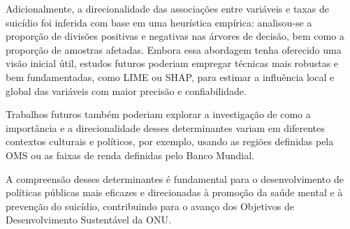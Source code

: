 \documentclass[letterpaper]{article}
\begin{document}
Adicionalmente, a direcionalidade das associações entre variáveis e taxas de suicídio foi inferida com base em uma heurística empírica: analisou-se a proporção de divisões positivas e negativas nas árvores de decisão, bem como a proporção de amostras afetadas. Embora essa abordagem tenha oferecido uma visão inicial útil, estudos futuros poderiam empregar técnicas mais robustas e bem fundamentadas, como LIME ou SHAP, para estimar a influência local e global das variáveis com maior precisão e confiabilidade.

Trabalhos futuros também poderiam explorar a investigação de como a importância e a direcionalidade desses determinantes variam em diferentes contextos culturais e políticos, por exemplo, usando as regiões definidas pela OMS ou as faixas de renda definidas pelo Banco Mundial.

A compreensão desses determinantes é fundamental para o desenvolvimento de políticas públicas mais eficazes e direcionadas à promoção da saúde mental e à prevenção do suicídio, contribuindo para o avanço dos Objetivos de Desenvolvimento Sustentável da ONU.



\end{document}
